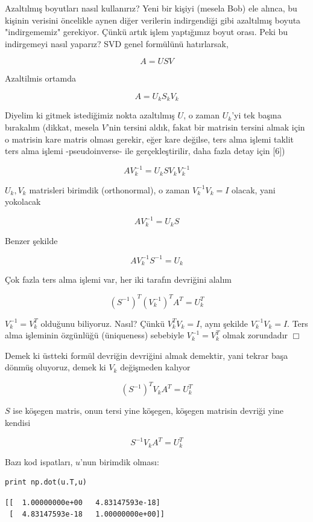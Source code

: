 \documentclass[12pt,fleqn]{article}\usepackage{../../common}
\begin{document}
Azaltılmış boyutları nasıl kullanırız? Yeni bir kişiyi (mesela Bob)
ele alınca, bu kişinin verisini öncelikle aynen diğer verilerin
indirgendiği gibi azaltılmış boyuta "indirgememiz" gerekiyor. Çünkü
artık işlem yaptığımız boyut orası. Peki bu indirgemeyi nasıl yaparız?
SVD genel formülünü hatırlarsak,

$$ A = USV $$

Azaltilmis ortamda

$$ A = U_k S_k V_k $$

Diyelim ki gitmek istediğimiz nokta azaltılmış $U$, o zaman $U_k$'yi tek
başına bırakalım (dikkat, mesela $V$'nin tersini aldık, fakat bir matrisin
tersini almak için o matrisin kare matris olması gerekir, eğer kare
değilse, ters alma işlemi taklit ters alma işlemi -pseudoinverse- ile
gerçekleştirilir, daha fazla detay için [6])

$$ A V_k^{-1} = U_k S V_k V_k^{-1} $$

$U_k,V_k$ matrisleri birimdik (orthonormal), o zaman $V_k^{-1}V_k = I$
olacak, yani yokolacak

$$ A V_k^{-1} = U_k S  $$

Benzer şekilde

$$  A V_k^{-1} S^{-1} = U_k $$

Çok fazla ters alma işlemi var, her iki tarafın devriğini alalım

$$ (S^{-1})^T (V_k^{-1})^T A^T = U_k^T $$

$V_k^{-1} = V_k^T$ olduğunu biliyoruz. Nasıl? Çünkü $ V_k^TV_k = I $, aynı
şekilde $ V_k^{-1}V_k = I $. Ters alma işleminin özgünlüğü (üniqueness)
sebebiyle $V_k^{-1} = V_k^T$ olmak zorundadır $\Box$

Demek ki üstteki formül devriğin devriğini almak demektir, yani tekrar başa
dönmüş oluyoruz, demek ki $V_k$ değişmeden kalıyor

$$ (S^{-1})^T V_k A^T = U_k^T $$

$S$ ise köşegen matris, onun tersi yine köşegen, köşegen matrisin devriği
yine kendisi

$$ S^{-1} V_k A^T = U_k^T $$

Bazı kod ispatları, $u$'nun birimdik olması:

\begin{verbatim}
print np.dot(u.T,u)
\end{verbatim}

\begin{verbatim}
[[  1.00000000e+00   4.83147593e-18]
 [  4.83147593e-18   1.00000000e+00]]
\end{verbatim}
\end{document}
